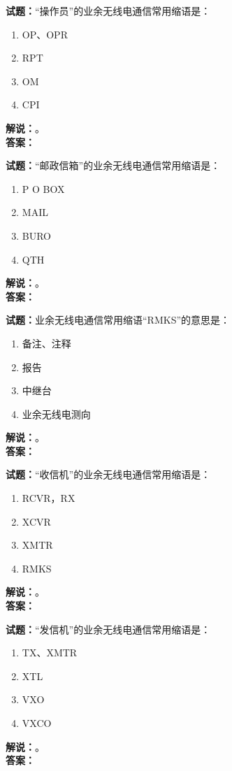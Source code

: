 \documentclass{ctexbook}
\begin{document}
\noindent\textbf{试题：}“操作员”的业余无线电通信常用缩语是：
\begin{enumerate}[leftmargin=3em]
\item OP、OPR
\item RPT
\item OM
\item CPI
\end{enumerate}
\noindent\textbf{解说：}\textbf{}。\\\noindent\textbf{答案：}

\bigskip




\noindent\textbf{试题：}“邮政信箱”的业余无线电通信常用缩语是：
\begin{enumerate}[leftmargin=3em]
\item P O BOX
\item MAIL
\item BURO
\item QTH
\end{enumerate}
\noindent\textbf{解说：}\textbf{}。\\\noindent\textbf{答案：}

\bigskip




\noindent\textbf{试题：}业余无线电通信常用缩语“RMKS”的意思是：
\begin{enumerate}[leftmargin=3em]
\item 备注、注释
\item 报告
\item 中继台
\item 业余无线电测向
\end{enumerate}
\noindent\textbf{解说：}\textbf{}。\\\noindent\textbf{答案：}

\bigskip




\noindent\textbf{试题：}“收信机”的业余无线电通信常用缩语是：
\begin{enumerate}[leftmargin=3em]
\item RCVR，RX
\item XCVR
\item XMTR
\item RMKS
\end{enumerate}
\noindent\textbf{解说：}\textbf{}。\\\noindent\textbf{答案：}

\bigskip




\noindent\textbf{试题：}“发信机”的业余无线电通信常用缩语是：
\begin{enumerate}[leftmargin=3em]
\item TX、XMTR
\item XTL
\item VXO
\item VXCO
\end{enumerate}
\noindent\textbf{解说：}\textbf{}。\\\noindent\textbf{答案：}
\end{document}
